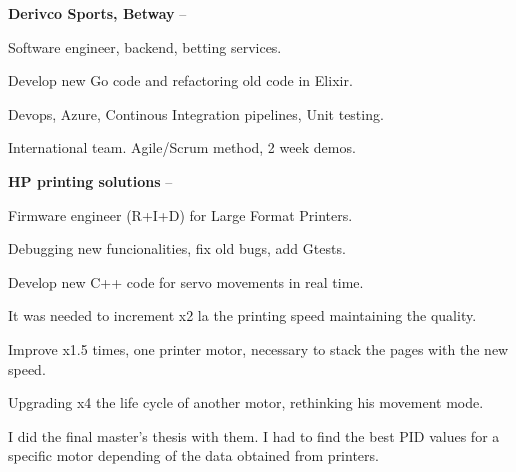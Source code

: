 \documentclass[letterpaper,MMMyyyy,nonstopmode]{simpleresumecv}
\newcommand\tab[1][0.5cm]{\hspace*{#1}}
\begin{document}
\begin{Body}
\Gap

{\textbf{Derivco Sports, Betway}}
\hfill
{} --

\tab Software engineer, backend, betting services. 

\tab Develop new Go code and refactoring old code in Elixir. 

\tab Devops, Azure, Continous Integration pipelines, Unit testing. 

\tab International team. Agile/Scrum method, 2 week demos. 

\Gap


{\textbf{HP printing solutions}}
\hfill
{} --

\tab Firmware engineer (R+I+D) for Large Format Printers. 

\tab Debugging new funcionalities, fix old bugs, add Gtests. 

\tab Develop new C++ code for servo movements in real time. 

\tab It was needed to increment x2 la the printing speed maintaining the quality.

\tab Improve x1.5 times, one printer motor, necessary to stack the pages with the new speed.

\tab Upgrading x4 the life cycle of another motor, rethinking his movement mode.

\tab I did the final master's thesis with them. I had to find the best PID values for a
\tab \tab   specific motor depending of the data obtained from printers.


\end{Body}
\end{document}
